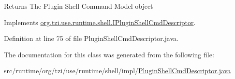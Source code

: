 \begin{DoxyReturn}{Returns}
The Plugin Shell Command Model object 
\end{DoxyReturn}


Implements \hyperlink{interfaceorg_1_1tzi_1_1use_1_1runtime_1_1shell_1_1_i_plugin_shell_cmd_descriptor_a538cf987a12bd6c53d52a41399b53b69}{org.\-tzi.\-use.\-runtime.\-shell.\-I\-Plugin\-Shell\-Cmd\-Descriptor}.



Definition at line 75 of file Plugin\-Shell\-Cmd\-Descriptor.\-java.



The documentation for this class was generated from the following file\-:\begin{DoxyCompactItemize}
\item 
src/runtime/org/tzi/use/runtime/shell/impl/\hyperlink{_plugin_shell_cmd_descriptor_8java}{Plugin\-Shell\-Cmd\-Descriptor.\-java}\end{DoxyCompactItemize}
